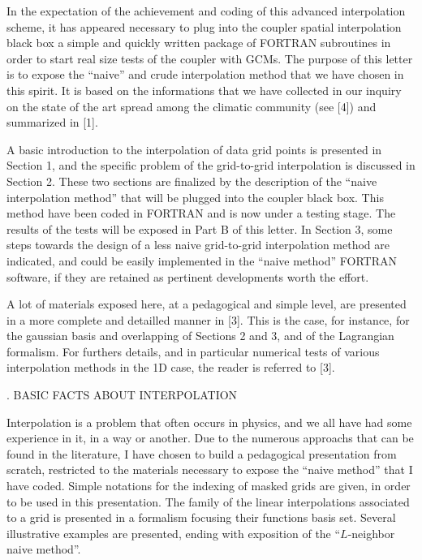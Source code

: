 In the expectation of the achievement and coding of this advanced
interpolation scheme, it has appeared necessary to plug into the coupler
spatial interpolation black box a simple and quickly written package of
FORTRAN subroutines  in order to start real size tests of the coupler with
 GCMs.  The purpose of this letter is to expose the
``naive'' and crude interpolation method that we have chosen in this spirit.
It is based on the informations that we have collected in our inquiry on the
state of the art spread among the climatic community (see [4]) and
summarized in [1]. 

A basic introduction to the interpolation of data grid points is presented
in Section 1, and the specific problem of the grid-to-grid interpolation is
discussed in Section 2. These two sections are finalized by the description
of the ``naive interpolation method'' that will be plugged into the coupler
black box. This method have been coded in FORTRAN and is now under a
testing stage.  The results of the tests will be exposed in Part B of this
letter. In Section 3, some steps towards the design of a less naive
grid-to-grid interpolation method are indicated, and could be easily
implemented in the ``naive method'' FORTRAN software, if they are
retained as pertinent developments worth the effort.


A lot of materials exposed here, at a pedagogical and
simple level, are presented in a more complete and detailled manner in [3].
This is the case, for instance, for  the gaussian basis and overlapping of
Sections 2 and 3, and of the Lagrangian formalism. For furthers details, and
in particular numerical tests of various interpolation methods in the 1D
case, the reader is referred to [3].




 

.  BASIC FACTS ABOUT INTERPOLATION 

Interpolation is a problem that often occurs in physics, and we all have
had some experience in it, in a way or another.  Due to the numerous
approachs that can be found in the literature, I  have chosen to build a
pedagogical presentation from scratch, restricted to the materials
necessary to expose the ``naive method''  that I have coded.  Simple
notations for the indexing of masked grids are given, in order to be used
in  this presentation. The family  of the linear  interpolations associated to a 
grid is presented in a formalism focusing  their  functions basis set.
Several illustrative examples are presented, ending with exposition of the
``$L$-neighbor naive method''.



